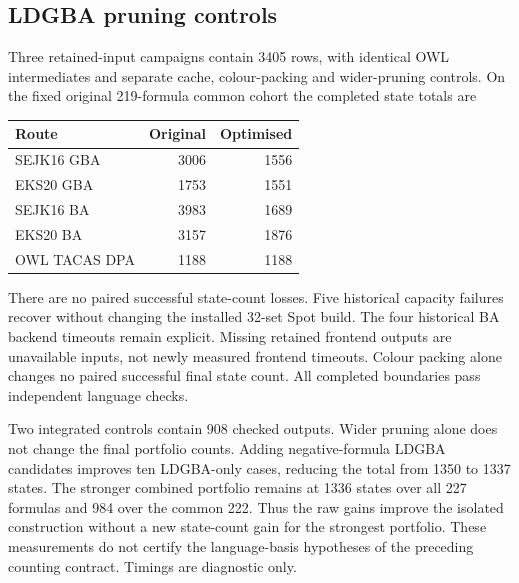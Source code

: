 \subsection{LDGBA pruning controls}
Three retained-input campaigns contain 3405 rows, with identical OWL
intermediates and separate cache, colour-packing and wider-pruning controls.
On the fixed original 219-formula common cohort the completed state totals are
\begin{center}\begin{tabular}{lrr}
Route & Original & Optimised\\\hline
SEJK16 GBA & 3006 & 1556\\
EKS20 GBA & 1753 & 1551\\
SEJK16 BA & 3983 & 1689\\
EKS20 BA & 3157 & 1876\\
OWL TACAS DPA & 1188 & 1188\\
\end{tabular}\end{center}
There are no paired successful state-count losses. Five historical capacity
failures recover without changing the installed 32-set Spot build. The four
historical BA backend timeouts remain explicit. Missing retained frontend
outputs are unavailable inputs, not newly measured frontend timeouts.
Colour packing alone changes no paired successful final state count.
All completed boundaries pass independent language checks.

Two integrated controls contain 908 checked outputs. Wider pruning alone
does not change the final portfolio counts. Adding negative-formula LDGBA
candidates improves ten LDGBA-only cases, reducing the total from 1350 to
1337 states. The stronger combined portfolio remains at 1336 states over
all 227 formulas and 984 over the common 222. Thus the raw gains improve
the isolated construction without a new state-count gain for the strongest
portfolio. These measurements do not certify the language-basis hypotheses
of the preceding counting contract. Timings are diagnostic only.
